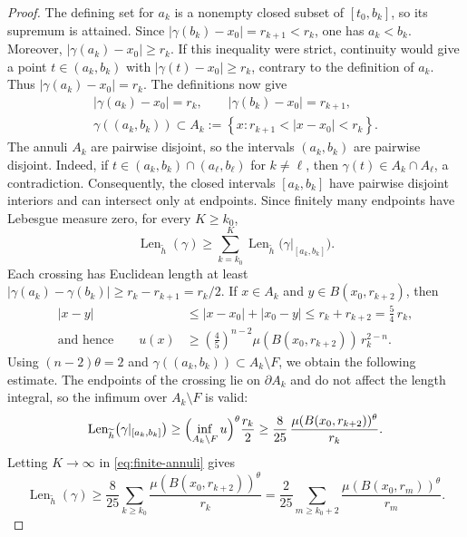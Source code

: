 \documentclass[12pt,oneside,a4paper]{article}
\theoremstyle{mytheorem}
\theoremstyle{remark}
\theoremstyle{definition}
\begin{document}
\begin{proof}
The defining set for $a_k$ is a nonempty closed subset of
$[t_0,b_k]$, so its supremum is attained.  Since
$|\gamma(b_k)-x_0|=r_{k+1}<r_k$, one has $a_k<b_k$.  Moreover,
$|\gamma(a_k)-x_0|\ge r_k$.  If this inequality were strict,
continuity would give a point $t\in(a_k,b_k)$ with
$|\gamma(t)-x_0|\ge r_k$, contrary to the definition of $a_k$.
Thus $|\gamma(a_k)-x_0|=r_k$.  The definitions now give
\[
\begin{gathered}
 |\gamma(a_k)-x_0|=r_k,
 \qquad
 |\gamma(b_k)-x_0|=r_{k+1},
 \\
 \gamma((a_k,b_k))
 \subset
 A_k:=
 \left\{
 x:r_{k+1}<|x-x_0|<r_k
 \right\}.
\end{gathered}
\]
The annuli $A_k$ are pairwise disjoint, so the intervals $(a_k,b_k)$
are pairwise disjoint.  Indeed, if
$t\in(a_k,b_k)\cap(a_\ell,b_\ell)$ for $k\ne\ell$, then
$\gamma(t)\in A_k\cap A_\ell$, a contradiction.  Consequently, the
closed intervals $[a_k,b_k]$ have pairwise disjoint interiors and can
intersect only at endpoints.  Since finitely many endpoints have
Lebesgue measure zero, for every $K\ge k_0$,
\begin{equation}\label{eq:finite-annuli}
 \operatorname{Len}_{\widetilde h}(\gamma)
 \ge
 \sum_{k=k_0}^{K}
 \operatorname{Len}_{\widetilde h}
 \bigl(\gamma|_{[a_k,b_k]}\bigr).
\end{equation}
Each crossing has Euclidean length at least
$|\gamma(a_k)-\gamma(b_k)|\ge r_k-r_{k+1}=r_k/2$.  If $x\in A_k$ and
$y\in B(x_0,r_{k+2})$, then
\[
\begin{aligned}
 |x-y|
 &\le
 |x-x_0|+|x_0-y| \le
 r_k+r_{k+2}
 =
 \frac54\,r_k,\\
 \text{and hence}\qquad
 u(x)
 &\ge
 \left(\frac45\right)^{n-2}
 \mu(B(x_0,r_{k+2}))\,r_k^{2-n}.
\end{aligned}
\]
Using $(n-2)\theta=2$ and $\gamma((a_k,b_k))\subset A_k\setminus F$, we
obtain the following estimate.  The endpoints of the crossing lie on
$\partial A_k$ and do not affect the length integral, so the infimum over
$A_k\setminus F$ is valid:
\[
 \operatorname{Len}_{\widetilde h}
 \bigl(\gamma|_{[a_k,b_k]}\bigr)
 \ge
 \Bigl(\inf_{A_k\setminus F}u\Bigr)^\theta
 \frac{r_k}{2}
 \ge
 \frac{8}{25}\,
 \frac{\mu(B(x_0,r_{k+2}))^\theta}{r_k}.
\]
Letting $K\to\infty$ in \eqref{eq:finite-annuli} gives
\begin{equation}\label{eq:annuli}
 \operatorname{Len}_{\widetilde h}(\gamma)
 \ge
 \frac{8}{25}
 \sum_{k\ge k_0}
 \frac{\mu(B(x_0,r_{k+2}))^\theta}{r_k}
 =
 \frac{2}{25}
 \sum_{m\ge k_0+2}
 \frac{\mu(B(x_0,r_m))^\theta}{r_m}.

\end{equation}
\end{proof}
\end{document}
